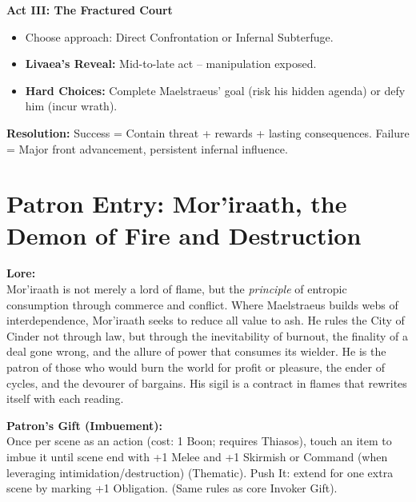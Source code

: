 \documentclass[11pt,letterpaper]{article}
\newcommand{\patronbox}[1]{\noindent\textbf{#1}\\}
\begin{document}
\textbf{Act III: The Fractured Court}
\begin{itemize}[leftmargin=*]
    \item Choose approach: Direct Confrontation or Infernal Subterfuge.
    \item \textbf{Livaea's Reveal:} Mid-to-late act -- manipulation exposed.
    \item \textbf{Hard Choices:} Complete Maelstraeus' goal (risk his hidden agenda) or defy him (incur wrath).
\end{itemize}

\textbf{Resolution:} Success = Contain threat + rewards + lasting consequences. Failure = Major front advancement, persistent infernal influence.

\section{Patron Entry: Mor'iraath, the Demon of Fire and Destruction}

\patronbox{Lore:} Mor'iraath is not merely a lord of flame, but the \textit{principle} of entropic consumption through commerce and conflict. Where Maelstraeus builds webs of interdependence, Mor'iraath seeks to reduce all value to ash. He rules the City of Cinder not through law, but through the inevitability of burnout, the finality of a deal gone wrong, and the allure of power that consumes its wielder. He is the patron of those who would burn the world for profit or pleasure, the ender of cycles, and the devourer of bargains. His sigil is a contract in flames that rewrites itself with each reading.

\patronbox{Patron's Gift (Imbuement):} Once per scene as an action (cost: 1 Boon; requires Thiasos), touch an item to imbue it until scene end with +1 Melee and +1 Skirmish or Command (when leveraging intimidation/destruction) (Thematic). Push It: extend for one extra scene by marking +1 Obligation. (Same rules as core Invoker Gift).
\end{document}
